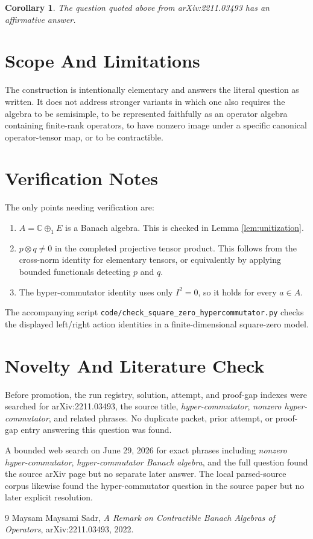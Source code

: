 \documentclass[11pt]{article}
\newtheorem{corollary}{Corollary}
\newcommand{\C}{\mathbb{C}}
\begin{document}
\begin{corollary}
The question quoted above from arXiv:2211.03493 has an affirmative answer.
\end{corollary}

\section*{Scope And Limitations}

The construction is intentionally elementary and answers the literal question
as written.  It does not address stronger variants in which one also requires
the algebra to be semisimple, to be represented faithfully as an operator
algebra containing finite-rank operators, to have nonzero image under a
specific canonical operator-tensor map, or to be contractible.

\section*{Verification Notes}

The only points needing verification are:
\begin{enumerate}
\item \(A=\C\oplus_1 E\) is a Banach algebra.  This is checked in Lemma
\ref{lem:unitization}.
\item \(p\otimes q\ne 0\) in the completed projective tensor product.  This
follows from the cross-norm identity for elementary tensors, or equivalently
by applying bounded functionals detecting \(p\) and \(q\).
\item The hyper-commutator identity uses only \(I^2=0\), so it holds for every
\(a\in A\).
\end{enumerate}

The accompanying script
\texttt{code/check\_square\_zero\_hypercommutator.py} checks the displayed
left/right action identities in a finite-dimensional square-zero model.

\section*{Novelty And Literature Check}

Before promotion, the run registry, solution, attempt, and proof-gap indexes
were searched for arXiv:2211.03493, the source title, \emph{hyper-commutator},
\emph{nonzero hyper-commutator}, and related phrases.  No duplicate packet,
prior attempt, or proof-gap entry answering this question was found.

A bounded web search on June 29, 2026 for exact phrases including
\emph{nonzero hyper-commutator}, \emph{hyper-commutator Banach algebra}, and
the full question found the source arXiv page but no separate later answer.
The local parsed-source corpus likewise found the hyper-commutator question in
the source paper but no later explicit resolution.

\begin{thebibliography}{9}
Maysam Maysami Sadr,
\emph{A Remark on Contractible Banach Algebras of Operators},
arXiv:2211.03493, 2022.
\end{thebibliography}
\end{document}
